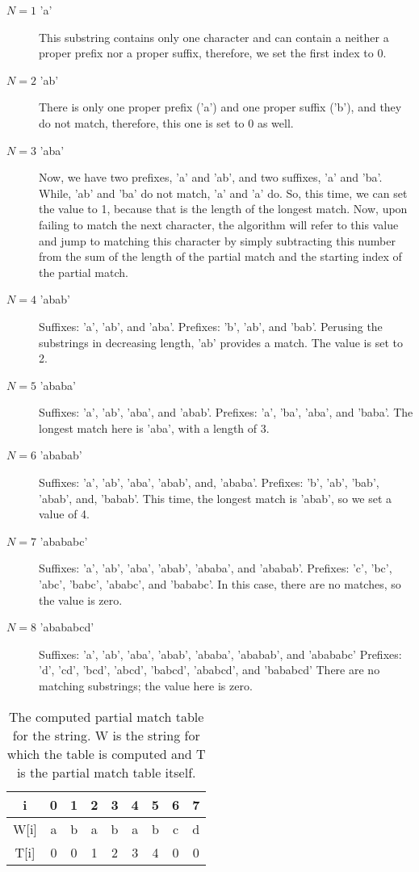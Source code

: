 \begin{description}
\item[$N = 1$ 'a']
This substring contains only one character and can contain a neither a proper prefix nor a proper suffix, therefore, we set the first index to 0.

\item[$N = 2$ 'ab']
There is only one proper prefix ('a') and one proper suffix ('b'), and they do not match, therefore, this one is set to 0 as well.

\item[$N = 3$ 'aba']
Now, we have two prefixes, 'a' and 'ab', and two suffixes, 'a' and 'ba'.
While, 'ab' and 'ba' do not match, 'a' and 'a' do.
So, this time, we can set the value to 1, because that is the length of the longest match.
Now, upon failing to match the next character, the algorithm will refer to this value and jump to matching this character by simply subtracting this number from the sum of the length of the partial match and the starting index of the partial match.

\item[$N = 4$ 'abab']
Suffixes: 'a', 'ab', and 'aba'.
Prefixes: 'b', 'ab', and 'bab'.
Perusing the substrings in decreasing length, 'ab' provides a match. The value is set to 2.

\item[$N = 5$ 'ababa']
Suffixes: 'a', 'ab', 'aba', and 'abab'.
Prefixes: 'a', 'ba', 'aba', and 'baba'.
The longest match here is 'aba', with a length of 3.

\item[$N = 6$ 'ababab']
Suffixes: 'a', 'ab', 'aba', 'abab', and, 'ababa'.
Prefixes: 'b', 'ab', 'bab', 'abab', and, 'babab'.
This time, the longest match is 'abab', so we set a value of 4.

\item[$N = 7$ 'abababc']
Suffixes: 'a', 'ab', 'aba', 'abab', 'ababa', and 'ababab'.
Prefixes: 'c', 'bc', 'abc', 'babc', 'ababc', and 'bababc'.
In this case, there are no matches, so the value is zero.

\item[$N = 8$ 'abababcd']
Suffixes: 'a', 'ab', 'aba', 'abab', 'ababa', 'ababab', and 'abababc'
Prefixes: 'd', 'cd', 'bcd', 'abcd', 'babcd', 'ababcd', and 'bababcd'
There are no matching substrings; the value here is zero.
\end{description}

\begin{table}[h]
	\begin{center}
		\begin{tabular}{ | c | c | c | c | c | c | c | c | c | }
			\hline
			i     & 0 & 1 & 2 & 3 & 4 & 5 & 6 & 7 \\ \hline
			W[i]  & a & b & a & b & a & b & c & d \\ \hline
			T[i]  & 0 & 0 & 1 & 2 & 3 & 4 & 0 & 0 \\ \hline
		\end{tabular}
		\caption{The computed partial match table for the string.
		W is the string for which the table is computed and T is the partial match table itself.}
	\end{center}
\end{table}

